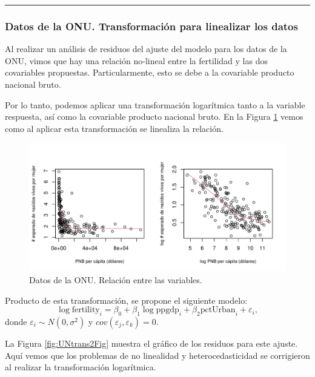 \documentclass[
]{article}
\begin{document}
\rule{\textwidth}{0.4pt}

\hypertarget{datos-de-la-onu.-transformaciuxf3n-para-linealizar-los-datos}{%
\subsubsection*{Datos de la ONU. Transformación para linealizar los datos}\label{datos-de-la-onu.-transformaciuxf3n-para-linealizar-los-datos}}

Al realizar un análisis de residuos del ajuste del modelo para los datos de la ONU, vimos que hay una relación no-lineal entre la fertilidad y las dos covariables propuestas. Particularmente, esto se debe a la covariable producto nacional bruto.

Por lo tanto, podemos aplicar una transformación logarítmica tanto a la variable respuesta, así como la covariable producto nacional bruto. En la Figura \ref{fig:UNtransFig} vemos como al aplicar esta transformación se linealiza la relación.

\begin{figure}

{\centering \includegraphics{MLGI_files/figure-latex/UNtransFig-1} 

}

\caption{Datos de la ONU. Relación entre las variables.}\label{fig:UNtransFig}
\end{figure}

Producto de esta transformación, se propone el siguiente modelo:
\[
\log \mbox{fertility}_{i} = \beta_{0} + \beta_{1}\log \mbox{ppgdp}_{i} + \beta_{2}\mbox{pctUrban}_{i} + \varepsilon_{i},
\]
donde \(\varepsilon_{i}\sim N(0,\sigma^{2})\) y \(cov(\varepsilon_{j},\varepsilon_{k})=0\).

La Figura \ref{fig:UNtrans2Fig} muestra el gráfico de los residuos para este ajuste. Aquí vemos que los problemas de no linealidad y heterocedasticidad se corrigieron al realizar la transformación logarítmica.
\end{document}
